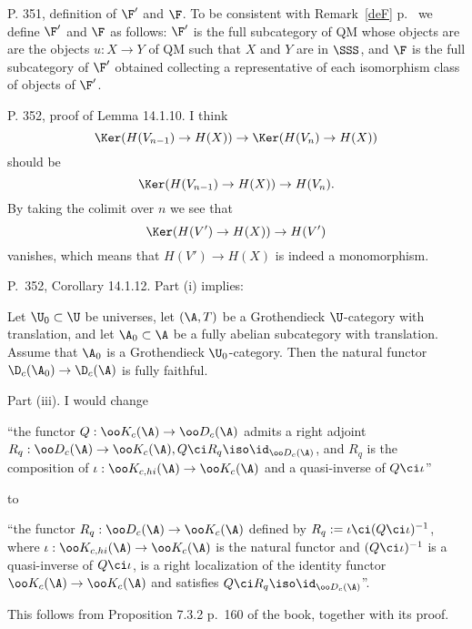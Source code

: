 \documentclass[12pt]{article}
\theoremstyle{remark}
\theoremstyle{definition}
\begin{document}
%

\begin{s}
P. 351, definition of $\F'$ and $\F$. To be consistent with Remark~\ref{deF} p.~ we define $\F'$ and $\F$ as follows: $\F'$ is the full subcategory of QM whose objects are are the objects $u:X\to Y$ of QM such that $X$ and $Y$ are in $\SSS$, and $\F$ is the full subcategory of $\F'$ obtained collecting a representative of each isomorphism class of objects of $\F'$.
\end{s}

%

\begin{s}
P. 352, proof of Lemma 14.1.10. I think 
$$
\Ker(H(V_{n-1})\to H(X))\to\Ker(H(V_n)\to H(X))
$$ 
should be 
$$
\Ker(H(V_{n-1})\to H(X))\to H(V_n).
$$ 
By taking the colimit over $n$ we see that 
$$
\Ker(H(V')\to H(X))\to H(V')
$$ 
vanishes, which means that $H(V')\to H(X)$ is indeed a monomorphism.
\end{s}

%

\begin{s}
P.~352, Corollary 14.1.12. Part (i) implies:%

Let $\U_0\subset\U$ be universes, let $(\A,T)$ be a Grothendieck $\U$-category with translation, and let $\A_0\subset\A$ be a fully abelian subcategory with translation. Assume that $\A_0$ is a Grothendieck $\U_0$-category. Then the natural functor $\D_c(\A_0)\to\D_c(\A)$ is fully faithful.%

\nn Part (iii). %
I would change 

\nn``the functor $Q:\oo K_c(\A)\to\oo D_c(\A)$ admits a right adjoint $R_q:\oo D_c(\A)\to\oo K_c(\A), Q\ci R_q\iso\id_{\oo D_c(\A)}$, and $R_q$ is the composition of $\iota:\oo K_{c,hi}(\A)\to\oo K_c(\A)$ and a quasi-inverse of $Q\ci\iota$''

\nn to

\nn``the functor $R_q:\oo D_c(\A)\to\oo K_c(\A)$ defined by $R_q:=\iota\ci(Q\ci\iota)^{-1}$, where $\iota:\oo K_{c,hi}(\A)\to\oo K_c(\A)$ is the natural functor and $(Q\ci\iota)^{-1}$ is a quasi-inverse of $Q\ci\iota$, is a right localization of the identity functor $\oo K_c(\A)\to\oo K_c(\A)$ and satisfies $Q\ci R_q\iso\id_{\oo D_c(\A)}$''.

This follows from Proposition 7.3.2 p.~160 of the book, together with its proof.
\end{s}
\end{document}
